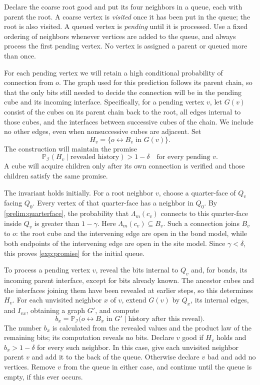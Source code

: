 \documentclass[11pt]{article}
\theoremstyle{definition}
\theoremstyle{remark}
\numberwithin{equation}{section}
\begin{document}
Declare the coarse root good and put its four neighbors in a queue, each
with parent the root. A coarse vertex is \emph{visited} once it has been
put in the queue; the root is also visited. A queued vertex is
\emph{pending} until it is processed. Use a fixed ordering of neighbors
whenever vertices are added to the queue, and always process the first
pending vertex. No vertex is assigned a parent or queued more than once.

For each pending vertex we will retain a high conditional probability
of connection from $o$. The graph used for this prediction follows
its parent chain, so that the only bits still needed to decide the
connection will be in the pending cube and its incoming interface.
Specifically, for a pending vertex $v$, let $G(v)$ consist of the
cubes on its parent chain back to the root, all edges internal to
those cubes, and the interfaces between successive cubes of the
chain. We include no other edges, even when nonsuccessive cubes
are adjacent. Set
\[
 H_v=\{o\leftrightarrow B_v\text{ in }G(v)\}.
\]
The construction will maintain the promise
\begin{equation}
 \mathbb P_{\mathcal I}(H_v\mid\text{revealed history})>1-\delta
 \quad\text{for every pending }v.
 \label{exp:promise}
\end{equation}
A cube will acquire children only after its own connection is
verified and those children satisfy the same promise.

The invariant holds initially. For a root neighbor $v$, choose a
quarter-face of $Q_v$ facing $Q_0$. Every vertex of that quarter-face has
a neighbor in $Q_0$. By \eqref{prelim:quarterface}, the probability that
$\Lambda_m(c_v)$ connects to this quarter-face inside $Q_v$ is greater
than $1-\gamma$. Here $\Lambda_m(c_v)\subseteq B_v$. Such a connection
joins $B_v$ to $o$: the root cube and the intervening edge are open in
the bond model, while both endpoints of the intervening edge are open
in the site model. Since $\gamma<\delta$, this proves
\eqref{exp:promise} for the initial queue.

To process a pending vertex $v$, reveal the bits internal to $Q_v$ and, for
bonds, its incoming parent interface, except for bits already known.
The ancestor cubes and the interfaces joining them have been
revealed at earlier steps, so this determines $H_v$.
For each unvisited neighbor $x$ of $v$, extend $G(v)$ by $Q_x$,
its internal edges, and $I_{vx}$, obtaining a graph $G'$, and compute
\begin{equation}
 b_x=\mathbb P_{\mathcal I}
 \bigl(o\leftrightarrow B_x\text{ in }G'
       \mid\text{history after this reveal}\bigr).
 \label{exp:child-probability}
\end{equation}
The number $b_x$ is calculated from the revealed values and the
product law of the remaining bits; its computation reveals no bits.
Declare $v$ good if $H_v$ holds and $b_x>1-\delta$ for every such
neighbor. In this case, give each unvisited neighbor parent $v$
and add it to the back of the queue. Otherwise declare $v$ bad and
add no vertices. Remove $v$ from the queue in either case, and
continue until the queue is empty, if this ever occurs.
\end{document}
